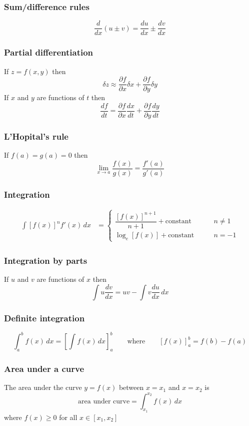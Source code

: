 \subsubsection*{Sum/difference rules}
$$\frac{d}{dx}(u \pm v) = \frac{du}{dx} \pm \frac{dv}{dx}$$

\subsubsection*{Partial differentiation}
If $z = f(x,y)$ then
$$\delta z \approx \frac{\partial f}{\partial x}\delta x + \frac{\partial f}{\partial y} \delta y$$
If $x$ and $y$ are functions of $t$ then
$$\frac{df}{dt} = \frac{\partial f}{\partial x}\frac{dx}{dt} + \frac{\partial f}{\partial y}\frac{dy}{dt}$$

\subsubsection*{L'Hopital's rule}
If $f(a)=g(a)=0$ then
$$\lim_{x \rightarrow a} \frac{f(x)}{g(x)} = \frac{f'(a)}{g'(a)}$$

\subsubsection*{Integration}
\begin{align*}
	\int [f(x)]^n f'(x) \, dx &= \left\{ \begin{array}{ll} \dfrac{[f(x)]^{n+1}}{n+1} + \mbox{constant}		& \qquad n \neq 1 \\ \log_e [f(x)] + \mbox{constant} & \qquad n = -1 \end{array} \right.
\end{align*}

\subsubsection*{Integration by parts}
If $u$ and $v$ are functions of $x$ then
$$\int u \frac{dv}{dx} = uv - \int v \frac{du}{dx} \, dx$$

\subsubsection*{Definite integration}
$$\int_{a}^{b} f(x) \, dx = \left[ \int f(x) \, dx \right]_a^b \qquad \mbox{where} \qquad
\left[f(x)\right]_a^b = f(b) - f(a)$$

\subsubsection*{Area under a curve}
The area under the curve $y=f(x)$ between $x=x_1$ and $x=x_2$ is
$$\mbox{area under curve}=\int_{x_1}^{x_2} f(x) \, dx$$
where $f(x) \geq 0$ for all $x \in [x_1,x_2]$

